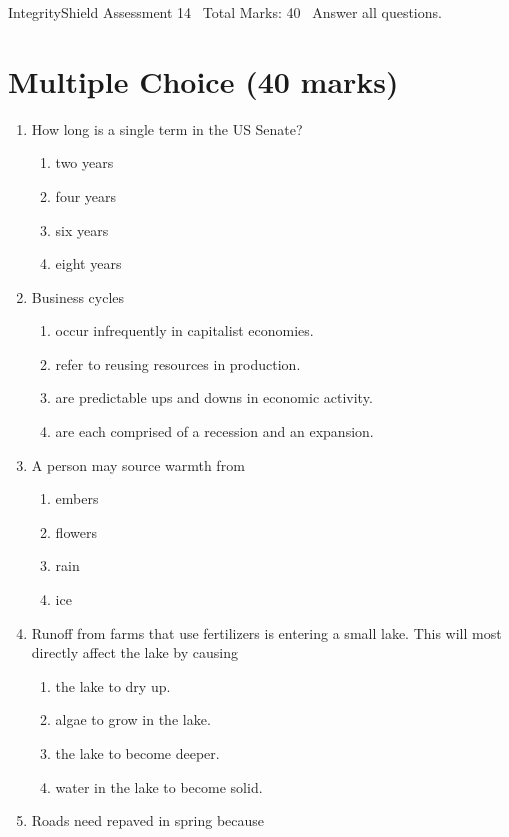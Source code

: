 \documentclass[12pt]{article}
\begin{document}
\begin{center}
IntegrityShield Assessment 14 \
Total Marks: 40 \
Answer all questions.
\end{center}

\section*{Multiple Choice (40 marks)}
\begin{enumerate}[label=\arabic*.]
\item How long is a single term in the US Senate?
\begin{enumerate}[label=(\alph*)]
    \item two years
    \item four years
    \item six years
    \item eight years
\end{enumerate}
\item Business cycles
\begin{enumerate}[label=(\alph*)]
    \item occur infrequently in capitalist economies.
    \item refer to reusing resources in production.
    \item are predictable ups and downs in economic activity.
    \item are each comprised of a recession and an expansion.
\end{enumerate}
\item A person may source warmth from
\begin{enumerate}[label=(\alph*)]
    \item embers
    \item flowers
    \item rain
    \item ice
\end{enumerate}
\item Runoff from farms that use fertilizers is entering a small lake. This will most directly affect the lake by causing
\begin{enumerate}[label=(\alph*)]
    \item the lake to dry up.
    \item algae to grow in the lake.
    \item the lake to become deeper.
    \item water in the lake to become solid.
\end{enumerate}
\item Roads need repaved in spring because

\end{enumerate}
\end{document}
